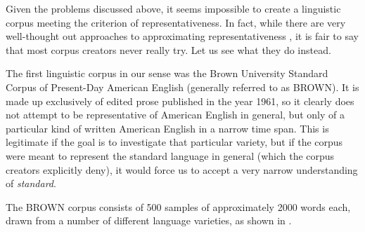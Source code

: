 Given the problems discussed above, it seems impossible to create a linguistic corpus meeting the criterion of representativeness.  In fact, while there are very well\hyp{}thought out approaches to approximating representativeness \citep[cf., e.g.,][]{biber_representativeness_1993}, it is fair to say that most corpus creators never really try. Let us see what they do instead.

The first linguistic corpus in our sense was the Brown University Standard Corpus of Present\hyp{}Day American  English (generally referred to as BROWN).  It is made up exclusively of edited prose published in the year 1961, so it clearly does not attempt to be representative  of American English in general, but only of a particular kind of written  American English in a narrow time span. This is legitimate if the goal is to investigate that particular variety,  but if the corpus were meant to represent the standard language in general (which the corpus creators explicitly deny), it would force us to accept a very narrow understanding of \textit{standard}.

The BROWN  corpus consists of 500 samples  of approximately 2000 words each, drawn from a number of different language varieties,  as shown in .

